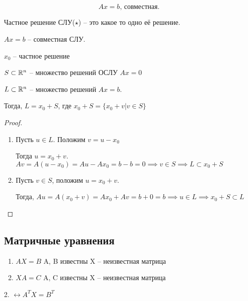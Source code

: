 \subsection{} %

\begin{equation}
    Ax = b \text{, совместная}
    \tag{$\star$}
.\end{equation}

Частное решение СЛУ($\star$) -- это какое то одно её решение.

\begin{statement}
    $Ax = b$ -- совместная СЛУ.

    $x_0$ -- частное решение

    $S \subset \mathbb{R}^n$ -- множество решений ОСЛУ $Ax = 0$

    $L \subset \mathbb{R}^n $ -- множество решений $Ax = b$.

    Тогда, $L = x_0 + S$, где $x_0 + S = \{x_0 + v | v \in S\}$
\end{statement}

\begin{proof}~
    \begin{enumerate}
    \item 
        Пусть $u \in L$. 
        Положим $v = u - x_0$

        Тогда $u = x_0 + v$. $Av = A(u - x_0) = Au - Ax_0 = b - b = 0 \implies v \in S \implies L \subset x_0 + S$

    \item
        Пусть $v \in S$, положим $u = x_0 + v$.

        Тогда, $Au = A(x_0 + v) = Ax_0 + Av = b + 0 = b \implies u \in L \implies x_0 + S \subset L$

    \end{enumerate}
\end{proof}

\subsection{Матричные уравнения}

\begin{enumerate}
\item $AX = B$
    A, B известны
    X -- неизвестная матрица

\item $XA = C$
    A, C известны
    X -- неизвестная матрица
\end{enumerate}

2. $\leftrightarrow A^T X = B^T$

